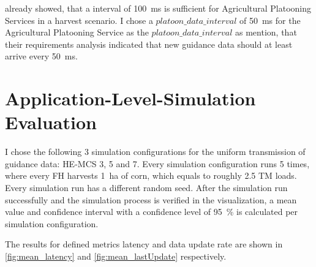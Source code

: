\textcite{zhang_method_2009} already showed, that a interval of \SI{100}{\milli\second} is sufficient for Agricultural Platooning Services
in a harvest scenario.
I chose a $platoon\_data\_interval$ of \SI{50}{\milli\second} for the Agricultural Platooning Service as the $platoon\_data\_interval$
as \textcite{smolnik_5g_2020} mention, that their requirements analysis indicated that new guidance data should at least arrive every \SI{50}{\milli\second}.

\section{Application-Level-Simulation Evaluation}
I chose the following 3 simulation configurations for the uniform transmission of guidance data: \ac{HE}-\ac{MCS} 3, 5 and 7.
Every simulation configuration runs \num{5} times, where every \ac{FH} harvests \SI{1}{\hectare} of corn, which equals to roughly
\num{2.5} \ac{TM} loads.
Every simulation run has a different random seed.
After the simulation run successfully and the simulation process is verified in the visualization,
a mean value and confidence interval with a confidence level of
\SI{95}{\percent} is calculated per simulation configuration.

The results for defined metrics latency and data update rate are shown in \autoref{fig:mean_latency} and
\autoref{fig:mean_lastUpdate} respectively.


